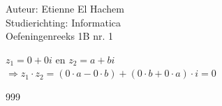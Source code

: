 \documentclass[a4paper]{article}
\begin{document}
  
\noindent \large Auteur: Etienne El Hachem \\
\noindent \large Studierichting: Informatica\\
\noindent \large Oefeningenreeks 1B nr. 1\\

\medskip

\normalsize

$z_1 = 0 + 0i$ en $z_2 = a + bi$\\

$\Rightarrow z_1 \cdot z_2 = (0 \cdot a - 0 \cdot b) + (0 \cdot b + 0 \cdot a)\cdot i = 0$

\begin{thebibliography}{999}
\end{thebibliography}
\end{document}
